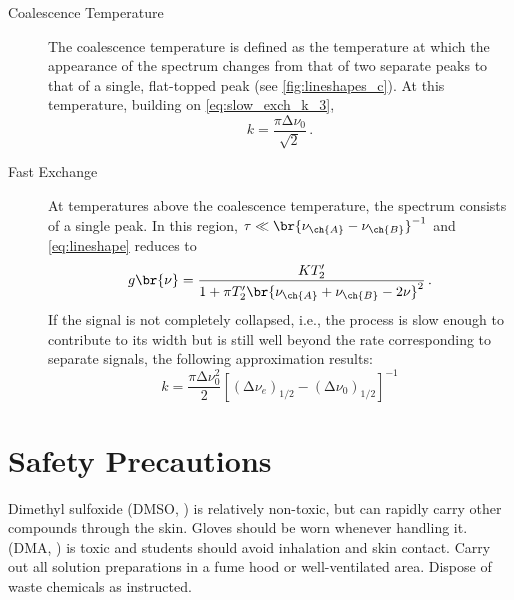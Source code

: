 \begin{description}
	\item[Coalescence Temperature]

	The coalescence temperature is defined as the temperature at which the appearance of the spectrum changes from that of two separate peaks to that of a single, flat-topped peak (see \cref{fig:lineshapes_c}). 
At this temperature, building on \cref{eq:slow_exch_k_3}, 
	\begin{equation}
  	k = \frac{\pi \increment \nu_0}{\sqrt{2}} \, .
  	\label{eq:intermed_exch_k}
	\end{equation}

	\item[Fast Exchange]

	At temperatures above the coalescence temperature, the spectrum consists of a single peak. 
	In this region, \( \tau \ll \br{\nu_{\ch{A}} - \nu_{\ch{B}}}^{-1} \) and \cref{eq:lineshape} reduces to
	\begin{equation}
		g\br{\nu} = \frac{K T'_2}{1 + \pi T'_2 \br{\nu_{\ch{A}} + \nu_{\ch{B}} - 2 \nu}^2} \, .
		\label{eq:fast_exch_lineshape}
	\end{equation}
	If the signal is not completely collapsed, i.e., the process is slow enough to contribute to its width but is still well beyond the rate corresponding to separate signals, the following approximation results:
	\begin{equation}
		k = \frac{\pi \increment \nu_0^2}{2} [(\increment \nu_e)_{1/2} - (\increment \nu_0)_{1/2}]^{-1}
		\label{eq:fast_exch_k}
	\end{equation}

\end{description}


\pagebreak

\section{Safety Precautions} %
\label{sec:safety}

Dimethyl sulfoxide (DMSO, ) is relatively non-toxic, but can rapidly carry other compounds through the skin. 
Gloves should be worn whenever handling it. 
 (DMA, ) is toxic and students should avoid inhalation and skin contact. 
Carry out all solution preparations in a fume hood or well-ventilated area. 
Dispose of waste chemicals as instructed. 


